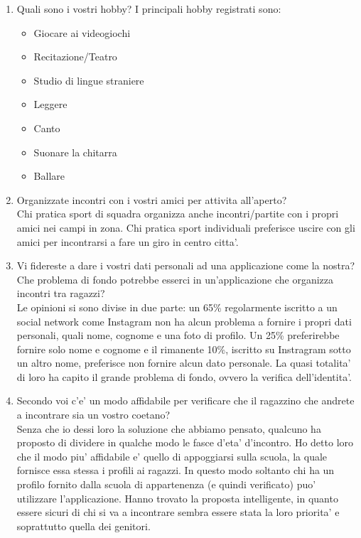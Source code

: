 \documentclass[12pt]{article}
\begin{document}
\begin{enumerate}
\begin{itemize}
  \end{itemize}
  \newpage
  \item Quali sono i vostri hobby?
  I principali hobby registrati sono:
  \begin{itemize}
    \item Giocare ai videogiochi
    \item Recitazione/Teatro
    \item Studio di lingue straniere
    \item Leggere
    \item Canto
    \item Suonare la chitarra
    \item Ballare
  \end{itemize}
  \item Organizzate incontri con i vostri amici per attivita all'aperto? \\
  Chi pratica sport di squadra organizza anche incontri/partite con i propri amici nei campi in zona. Chi pratica sport individuali preferisce uscire con gli amici per incontrarsi a fare un giro in centro citta'.
  \item Vi fidereste a dare i vostri dati personali ad una applicazione come la
    nostra? Che problema di fondo potrebbe esserci in un'applicazione che organizza incontri tra ragazzi? \\
    Le opinioni si sono divise in due parte: un 65\% regolarmente iscritto a un social network come Instagram non ha alcun problema a fornire i propri dati personali, quali nome, cognome e una foto di profilo. Un 25\% preferirebbe fornire solo
    nome e cognome e il rimanente 10\%, iscritto su Instragram sotto un altro nome, preferisce non fornire alcun dato personale. La quasi totalita' di loro ha capito il grande problema di fondo, ovvero la verifica dell'identita'.
  \item Secondo voi c'e' un modo affidabile per verificare che il ragazzino che andrete a incontrare sia un vostro coetano? \\
    Senza che io dessi loro la soluzione che abbiamo pensato, qualcuno ha proposto di dividere in qualche modo le fasce d'eta' d'incontro. Ho detto loro che il modo piu' affidabile e' quello di appoggiarsi sulla scuola, la quale fornisce essa
    stessa i profili ai ragazzi. In questo modo soltanto chi ha un profilo fornito dalla scuola di appartenenza (e quindi verificato) puo' utilizzare l'applicazione. Hanno trovato la proposta intelligente, in quanto essere sicuri di chi si
    va a incontrare sembra essere stata la loro priorita' e soprattutto quella dei genitori.

\end{enumerate}
\end{document}

